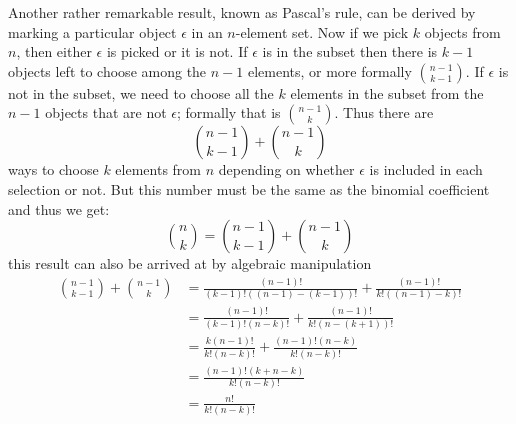 \myindent Another rather remarkable result, known as Pascal's rule, can be
derived by marking a particular object $\epsilon$ in an $n$-element set. Now if
we pick $k$ objects from $n$, then either $\epsilon$ is picked or it is not. If
$\epsilon$ is in the subset then there is $k-1$ objects left to choose among
the $n-1$ elements, or more formally $\binom{n-1}{k-1}$. If $\epsilon$ is not
in the subset, we need to choose all the $k$ elements in the subset from the
$n-1$ objects that are not $\epsilon$; formally that is $\binom{n-1}{k}$. Thus
there are
\[
\binom{n-1}{k-1} + \binom{n-1}{k}
\]
ways to choose $k$ elements from $n$ depending on whether $\epsilon$ is included
in each selection or not. But this number must be the same as the binomial
coefficient and thus we get:
\begin{equation}\label{pascal_rule}
\binom{n}{k}  = \binom{n-1}{k-1} + \binom{n-1}{k}
\end{equation}
this result can also be arrived at by algebraic manipulation
\begin{align*}
 \binom{n-1}{k-1} + \binom{n-1}{k}
& =  \frac{(n-1)!}{(k-1)!((n-1)-(k-1))!} + \frac{(n-1)!}{k!((n - 1) - k)!} \\
& =  \frac{(n-1)!}{(k-1)!(n-k)!} + \frac{(n-1)!}{k!(n - (k + 1))!} \\
& =  \frac{k(n-1)!}{k!(n-k)!} + \frac{(n-1)!(n-k)}{k!(n - k)!} \\
& =  \frac{(n-1)!(k + n - k)}{k!(n-k)!} \\
& =  \frac{n!}{k!(n-k)!}
\end{align*}

